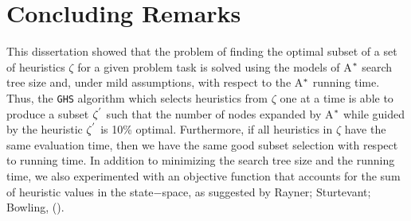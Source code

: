 
 
\chapter{Concluding Remarks}\label{ch:conclusions}

\iffalse
\chapterprecis{The purpose of this section is to introduce the meta-reasoning proposed.}\index{sinopse de capítulo}
\fi

\noindent
This dissertation showed that the problem of finding the optimal subset of a set of heuristics $\zeta$ for a given problem task is solved using the models of A$\sp{*}$ search tree size and, under mild assumptions, with respect to the A$\sp{*}$ running time. Thus, the \texttt{GHS} algorithm which selects heuristics from $\zeta$ one at a time is able to produce a subset $\zeta\sp{'}$ such that the number of nodes expanded by A$\sp{*}$ while guided by the heuristic $\zeta\sp{'}$ is 10\% optimal. Furthermore, if all heuristics in $\zeta$ have the same evaluation time, then we have the same good subset selection with respect to running time. In addition to minimizing the search tree size and the running time, we also experimented with an objective function that accounts for the sum of heuristic values in the state$-$space, as suggested by Rayner; Sturtevant; Bowling, (\citeyear{raynersss13}).\\

